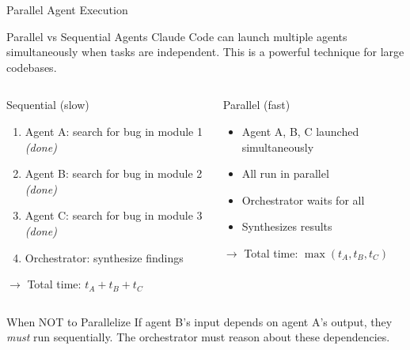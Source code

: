 \documentclass[aspectratio=169,xcolor=dvipsnames]{beamer}
\begin{document}
\begin{frame}{Parallel Agent Execution}
    \begin{block}{Parallel vs Sequential Agents}
        Claude Code can launch multiple agents simultaneously when tasks are independent. This is a powerful technique for large codebases.
    \end{block}

    \begin{columns}
        \begin{exampleblock}{Sequential (slow)}
            \begin{enumerate}
                \item Agent A: search for bug in module 1 \emph{(done)}
                \item Agent B: search for bug in module 2 \emph{(done)}
                \item Agent C: search for bug in module 3 \emph{(done)}
                \item Orchestrator: synthesize findings
            \end{enumerate}
            \centering $\rightarrow$ Total time: $t_A + t_B + t_C$
        \end{exampleblock}

        \begin{exampleblock}{Parallel (fast)}
            \begin{itemize}
                \item Agent A, B, C launched simultaneously
                \item All run in parallel
                \item Orchestrator waits for all
                \item Synthesizes results
            \end{itemize}
            \centering $\rightarrow$ Total time: $\max(t_A, t_B, t_C)$
        \end{exampleblock}
    \end{columns}

    \vspace{0.3cm}
    \begin{alertblock}{When NOT to Parallelize}
        If agent B's input depends on agent A's output, they \emph{must} run sequentially. The orchestrator must reason about these dependencies.
    \end{alertblock}
\end{frame}
\end{document}
